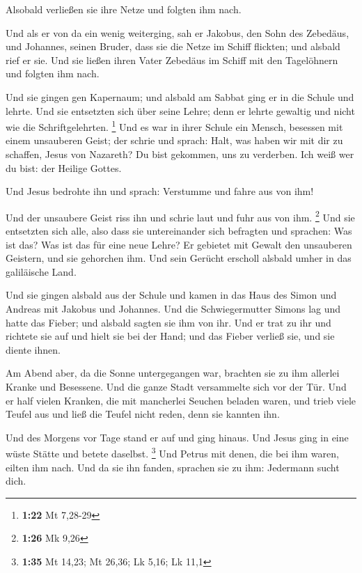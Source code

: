  Alsobald verließen sie ihre Netze und folgten ihm nach.

 Und als er von da ein wenig weiterging, sah er Jakobus,
den Sohn des Zebedäus, und Johannes, seinen Bruder, dass sie die Netze
im Schiff flickten; und alsbald rief er sie.  Und sie
ließen ihren Vater Zebedäus im Schiff mit den Tagelöhnern und folgten
ihm nach.

 Und sie gingen gen Kapernaum; und alsbald am Sabbat ging
er in die Schule und lehrte.  Und sie entsetzten sich über
seine Lehre; denn er lehrte gewaltig und nicht wie die Schriftgelehrten.
\footnote{\textbf{1:22} Mt 7,28-29}  Und es war in ihrer
Schule ein Mensch, besessen mit einem unsauberen Geist; der schrie
 und sprach: Halt, was haben wir mit dir zu schaffen, Jesus
von Nazareth? Du bist gekommen, uns zu verderben. Ich weiß wer du bist:
der Heilige Gottes.

 Und Jesus bedrohte ihn und sprach: Verstumme und fahre aus
von ihm!

 Und der unsaubere Geist riss ihn und schrie laut und fuhr
aus von ihm. \footnote{\textbf{1:26} Mk 9,26}  Und sie
entsetzten sich alle, also dass sie untereinander sich befragten und
sprachen: Was ist das? Was ist das für eine neue Lehre? Er gebietet mit
Gewalt den unsauberen Geistern, und sie gehorchen ihm.  Und
sein Gerücht erscholl alsbald umher in das galiläische Land.

 Und sie gingen alsbald aus der Schule und kamen in das
Haus des Simon und Andreas mit Jakobus und Johannes.  Und
die Schwiegermutter Simons lag und hatte das Fieber; und alsbald sagten
sie ihm von ihr.  Und er trat zu ihr und richtete sie auf
und hielt sie bei der Hand; und das Fieber verließ sie, und sie diente
ihnen.

 Am Abend aber, da die Sonne untergegangen war, brachten
sie zu ihm allerlei Kranke und Besessene.  Und die ganze
Stadt versammelte sich vor der Tür.  Und er half vielen
Kranken, die mit mancherlei Seuchen beladen waren, und trieb viele
Teufel aus und ließ die Teufel nicht reden, denn sie kannten ihn.

 Und des Morgens vor Tage stand er auf und ging hinaus. Und
Jesus ging in eine wüste Stätte und betete daselbst. \footnote{\textbf{1:35}
  Mt 14,23; Mt 26,36; Lk 5,16; Lk 11,1}  Und Petrus mit
denen, die bei ihm waren, eilten ihm nach.  Und da sie ihn
fanden, sprachen sie zu ihm: Jedermann sucht dich.

